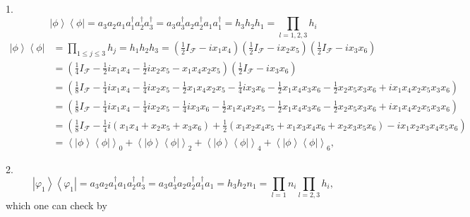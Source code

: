 \documentclass[aps,preprint]{revtex4}%
\begin{document}
1.
\begin{equation}
\left\vert \phi\right\rangle \left\langle \phi\right\vert =a_{3}a_{2}%
a_{1}a_{1}^{\dagger}a_{2}^{\dagger}a_{3}^{\dagger}=a_{3}a_{3}^{\dagger}%
a_{2}a_{2}^{\dagger}a_{1}a_{1}^{\dagger}=h_{3}h_{2}h_{1}=%
{\displaystyle\prod\limits_{l=1,2,3}}
h_{i}%
\end{equation}%
\begin{align}
\left\vert \phi\right\rangle \left\langle \phi\right\vert  &  =%
{\displaystyle\prod\limits_{1\leq j\leq3}}
h_{j}=h_{1}h_{2}h_{3}=\left(  \frac{1}{2}I_{\mathcal{F}}-ix_{1}x_{4}\right)
\left(  \frac{1}{2}I_{\mathcal{F}}-ix_{2}x_{5}\right)  \left(  \frac{1}%
{2}I_{\mathcal{F}}-ix_{3}x_{6}\right)  \\
&  =\left(  \frac{1}{4}I_{\mathcal{F}}-\frac{1}{2}ix_{1}x_{4}-\frac{1}%
{2}ix_{2}x_{5}-x_{1}x_{4}x_{2}x_{5}\right)  \left(  \frac{1}{2}I_{\mathcal{F}%
}-ix_{3}x_{6}\right)  \\
&  =\left(  \frac{1}{8}I_{\mathcal{F}}-\frac{1}{4}ix_{1}x_{4}-\frac{1}%
{4}ix_{2}x_{5}-\frac{1}{2}x_{1}x_{4}x_{2}x_{5}-\frac{1}{4}ix_{3}x_{6}-\frac
{1}{2}x_{1}x_{4}x_{3}x_{6}-\frac{1}{2}x_{2}x_{5}x_{3}x_{6}+ix_{1}x_{4}%
x_{2}x_{5}x_{3}x_{6}\right)  \\
&  =\left(  \frac{1}{8}I_{\mathcal{F}}-\frac{1}{4}ix_{1}x_{4}-\frac{1}%
{4}ix_{2}x_{5}-\frac{1}{4}ix_{3}x_{6}-\frac{1}{2}x_{1}x_{4}x_{2}x_{5}-\frac
{1}{2}x_{1}x_{4}x_{3}x_{6}-\frac{1}{2}x_{2}x_{5}x_{3}x_{6}+ix_{1}x_{4}%
x_{2}x_{5}x_{3}x_{6}\right)  \\
&  =\left(  \frac{1}{8}I_{\mathcal{F}}-\frac{1}{4}i\left(  x_{1}x_{4}%
+x_{2}x_{5}+x_{3}x_{6}\right)  +\frac{1}{2}\left(  x_{1}x_{2}x_{4}x_{5}%
+x_{1}x_{3}x_{4}x_{6}+x_{2}x_{3}x_{5}x_{6}\right)  -ix_{1}x_{2}x_{3}x_{4}%
x_{5}x_{6}\right)  \\
&  =\left\langle \left\vert \phi\right\rangle \left\langle \phi\right\vert
\right\rangle _{0}+\left\langle \left\vert \phi\right\rangle \left\langle
\phi\right\vert \right\rangle _{2}+\left\langle \left\vert \phi\right\rangle
\left\langle \phi\right\vert \right\rangle _{4}+\left\langle \left\vert
\phi\right\rangle \left\langle \phi\right\vert \right\rangle _{6},
\end{align}


2.%
\begin{equation}
\left\vert \varphi_{1}\right\rangle \left\langle \varphi_{1}\right\vert
=a_{3}a_{2}a_{1}^{\dagger}a_{1}a_{2}^{\dagger}a_{3}^{\dagger}=a_{3}%
a_{3}^{\dagger}a_{2}a_{2}^{\dagger}a_{1}^{\dagger}a_{1}=h_{3}h_{2}n_{1}=%
{\displaystyle\prod\limits_{l=1}}
n_{i}%
{\displaystyle\prod\limits_{l=2,3}}
h_{i},
\end{equation}
which one can check by%
\end{document}
